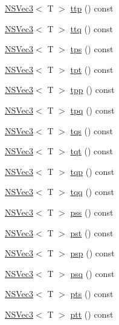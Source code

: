 \begin{DoxyCompactItemize}
\item 
\hyperlink{structNSVec3}{N\-S\-Vec3}$<$ T $>$ \hyperlink{structNSVec4_aeb5845c3864bd13f8d26ac26363327bb}{ttp} () const 
\item 
\hyperlink{structNSVec3}{N\-S\-Vec3}$<$ T $>$ \hyperlink{structNSVec4_acb9b16bd8c4a52a9797870692b365fdd}{ttq} () const 
\item 
\hyperlink{structNSVec3}{N\-S\-Vec3}$<$ T $>$ \hyperlink{structNSVec4_a74e478ba5d66bc48a7de979b2689d9bf}{tps} () const 
\item 
\hyperlink{structNSVec3}{N\-S\-Vec3}$<$ T $>$ \hyperlink{structNSVec4_aadb6aa856cd81bafec5e65d5375d4f61}{tpt} () const 
\item 
\hyperlink{structNSVec3}{N\-S\-Vec3}$<$ T $>$ \hyperlink{structNSVec4_a30f5ff786aec59997e6b3349b60eaeaa}{tpp} () const 
\item 
\hyperlink{structNSVec3}{N\-S\-Vec3}$<$ T $>$ \hyperlink{structNSVec4_a6be0101e1a8c5ddd1eb93af9cc8e6a07}{tpq} () const 
\item 
\hyperlink{structNSVec3}{N\-S\-Vec3}$<$ T $>$ \hyperlink{structNSVec4_a7ac00979141722af81bac4437465dee8}{tqs} () const 
\item 
\hyperlink{structNSVec3}{N\-S\-Vec3}$<$ T $>$ \hyperlink{structNSVec4_ae930bab9554b1ed36749f7418b851fbd}{tqt} () const 
\item 
\hyperlink{structNSVec3}{N\-S\-Vec3}$<$ T $>$ \hyperlink{structNSVec4_ab870ea6dc62bdb353f7351ffdfd80bd6}{tqp} () const 
\item 
\hyperlink{structNSVec3}{N\-S\-Vec3}$<$ T $>$ \hyperlink{structNSVec4_a96d313eddfcd670b5f5c77bf1d1772d4}{tqq} () const 
\item 
\hyperlink{structNSVec3}{N\-S\-Vec3}$<$ T $>$ \hyperlink{structNSVec4_a0e76eda340ed73064e7ba8336810fbd0}{pss} () const 
\item 
\hyperlink{structNSVec3}{N\-S\-Vec3}$<$ T $>$ \hyperlink{structNSVec4_a4fa8c6f3eef67163013d88afb6c8e3d5}{pst} () const 
\item 
\hyperlink{structNSVec3}{N\-S\-Vec3}$<$ T $>$ \hyperlink{structNSVec4_a3b50387b500b2c770e89dea52e41e8e8}{psp} () const 
\item 
\hyperlink{structNSVec3}{N\-S\-Vec3}$<$ T $>$ \hyperlink{structNSVec4_adea27dbdc9de3c839d2f79d3dbc6b7f2}{psq} () const 
\item 
\hyperlink{structNSVec3}{N\-S\-Vec3}$<$ T $>$ \hyperlink{structNSVec4_a0421a351268680d7374011f8dc41b546}{pts} () const 
\item 
\hyperlink{structNSVec3}{N\-S\-Vec3}$<$ T $>$ \hyperlink{structNSVec4_af3071e34945b45bb21adb9be06f0295c}{ptt} () const 

\end{DoxyCompactItemize}
